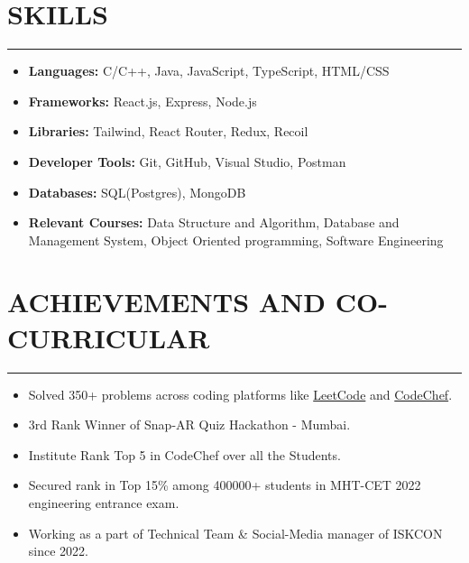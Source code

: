\documentclass[a4paper,10pt]{article}
\newcommand{\sectionline}[1]{%
    \par\noindent\rule[0.5ex]{\linewidth}{0.5pt}\vspace{-0.3em}%
}
\begin{document}
\section*{SKILLS}
\sectionline{}
\begin{itemize}[leftmargin=0.5in]
    \item \textbf{Languages:} C/C++, Java, JavaScript, TypeScript, HTML/CSS
    \item \textbf{Frameworks:} React.js, Express, Node.js
    \item \textbf{Libraries:} Tailwind, React Router, Redux, Recoil
    \item \textbf{Developer Tools:} Git, GitHub, Visual Studio, Postman
    \item \textbf{Databases:} SQL(Postgres), MongoDB
    \item \textbf{Relevant Courses:} Data Structure and Algorithm, Database and Management System, Object Oriented programming, Software Engineering
\end{itemize}

\section*{ACHIEVEMENTS AND CO-CURRICULAR}
\sectionline{}
\begin{itemize}[leftmargin=0.5in]
    \item Solved 350+ problems across coding platforms like \href{https://leetcode.com/u/Rohan_s21/}{LeetCode} and \href{https://www.codechef.com/users/rohan_s21}{CodeChef}.
    \item 3rd Rank Winner of Snap-AR Quiz Hackathon - Mumbai.
    \item Institute Rank Top 5 in CodeChef over all the Students.
    \item Secured rank in Top 15\% among 400000+ students in MHT-CET 2022 engineering entrance exam.
    \item Working as a part of Technical Team \& Social-Media manager of ISKCON since 2022.
\end{itemize}
\end{document}
